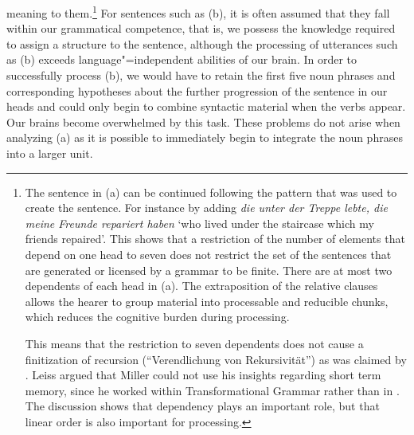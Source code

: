 meaning to them.\footnote{
  The sentence in (a) can be continued following the pattern that was used to create the
  sentence. For instance by adding \emph{die unter der
    Treppe lebte, die meine Freunde repariert haben} `who lived under the staircase which my
  friends repaired'. This shows that a restriction of the number of elements that depend on one head
to seven  \citep[]{Leiss2003a} does not restrict the set of the sentences that are
generated or licensed by a grammar to be finite. There are at most two dependents of each head in
(a). The extraposition of the relative clauses allows the hearer to group material into
processable and reducible chunks, which reduces the cognitive burden during processing.

  This means that the restriction to seven dependents does not cause a finitization of recursion
  (``Ver\-end\-lichung von Rekursivität'') as was claimed by \citet[]{Leiss2003a}.
  Leiss argued that Miller could not use his insights regarding short term memory, since he worked
  within Transformational Grammar rather than in \dg. The discussion
  shows that dependency plays an important role, but that linear order is also important for processing.
}
For sentences such as (b), it is often assumed that they fall within our grammatical competence, that is, we possess
the knowledge required to assign a structure to the sentence, although the processing of utterances such as (b) exceeds
language"=independent abilities of our brain.
In order to successfully process (b), we would have to retain the first five noun phrases and corresponding hypotheses
about the further progression of the sentence in our heads and could only begin to combine syntactic material when the verbs appear.
Our brains become overwhelmed by this task. These problems do not arise when analyzing (a) as it is possible
to immediately begin to integrate the noun phrases into a larger unit.

